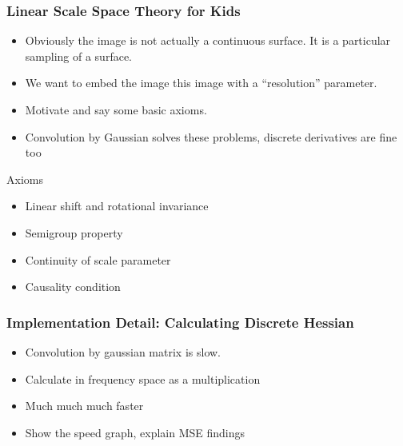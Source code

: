 \documentclass[9pt,notes]{beamer}
\begin{document}
\begin{frame}
\frametitle[Scale Space Theory]{Linear Scale Space Theory for Kids}
\begin{itemize}
  \item Obviously the image is not actually a continuous surface.
        It is a particular sampling of a surface. 
  \item We want to embed the image this image with a ``resolution'' parameter.
  \item Motivate and say some basic axioms.
  \item Convolution by Gaussian solves these problems, discrete derivatives are fine too
\end{itemize}

\begin{block}{Axioms}
  \begin{itemize}
    \item Linear shift and rotational invariance
    \item Semigroup property
    \item Continuity of scale parameter
    \item Causality condition
    \end{itemize}
  \end{block}

\end{frame}

\begin{frame}
\frametitle{Implementation Detail: Calculating Discrete Hessian}
\begin{itemize}
  \item Convolution by gaussian matrix is slow. 
  \item Calculate in frequency space as a multiplication
  \item Much much much faster
  \item Show the speed graph, explain MSE findings
\end{itemize}
\end{frame}
\end{document}
